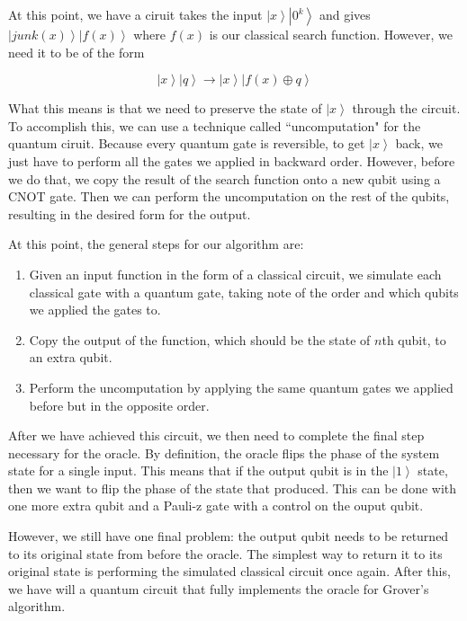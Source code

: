 \documentclass[11pt]{report}
\newcommand{\?}{\stackrel{?}{=}}
\begin{document}
At this point, we have a ciruit takes the input $\left | x \right \rangle \left | 0^{k} \right \rangle$ and gives $\left | junk(x) \right \rangle \left | f(x) \right \rangle$ where $f(x)$ is our classical search function. However, we need it to be of the form \cite{kothari12} 

$$\left | x \right \rangle \left | q \right \rangle \to \left | x \right \rangle \left | f(x) \oplus q \right \rangle$$

What this means is that we need to preserve the state of $\left | x \right \rangle$ through the circuit. To accomplish this, we can use a technique called ``uncomputation" for the quantum ciruit. Because every quantum gate is reversible, to get $\left | x \right \rangle$ back, we just have to perform all the gates we applied in backward order. However, before we do that, we copy the result of the search function onto a new qubit using a CNOT gate. Then we can perform the uncomputation on the rest of the qubits, resulting in the desired form for the output.

At this point, the general steps for our algorithm are:

\begin{enumerate}
	\item Given an input function in the form of a classical circuit, we simulate each classical gate with a quantum gate, taking note of the order and which qubits we applied the gates to.
	\item Copy the output of the function, which should be the state of $n$th qubit, to an extra qubit.
	\item Perform the uncomputation by applying the same quantum gates we applied before but in the opposite order. 
\end{enumerate}

After we have achieved this circuit, we then need to complete the final step necessary for the oracle. By definition, the oracle flips the phase of the system state for a single input. This means that if the output qubit is in the $\left | 1 \right \rangle$ state, then we want to flip the phase of the state that produced. This can be done with one more extra qubit and a Pauli-z gate with a control on the ouput qubit.

However, we still have one final problem: the output qubit needs to be returned to its original state from before the oracle. The simplest way to return it to its original state is performing the simulated classical circuit once again. After this, we have will a quantum circuit that fully implements the oracle for Grover's algorithm.
\end{document}
